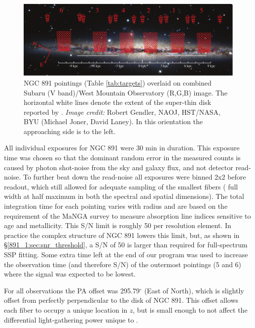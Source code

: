 \begin{figure}
  \centering
  \includegraphics[width=\textwidth]{891_1/figs/NGC_891_better_pointings.pdf}
  \caption[NGC 891 \GP pointing map]{\label{fig:pointings}\fixspacing
    NGC 891 \GP pointings (Table \ref{tab:targets}) overlaid on
    combined Subaru (V band)/West Mountain Observatory (R,G,B)
    image. The horizontal white lines denote the extent of the
    super-thin disk reported by \citet{Schechtman-Rook13}. \emph{Image
      credit:} Robert Gendler, NAOJ, HST/NASA, BYU (Michael Joner,
    David Laney). In this orientation the approaching side is to the
    left.}
\end{figure}

All individual exposures for NGC 891 were 30 min in duration. This
exposure time was chosen so that the dominant random error in the
measured counts is caused by photon shot-noise from the sky and galaxy
flux, and not detector read-noise. To further beat down the read-noise
all exposures were binned 2x2 before readout, which still allowed for
adequate sampling of the smallest fibers ( full
width at half maximum in both the spectral and spatial
dimensions). The total integration time for each pointing varies with
radius and are based on the requirement of the MaNGA survey
\citep{Bundy15} to measure absorption line indices sensitive to age
and metallicity. This S/N limit is roughly 50 per resolution
element. In practice the complex structure of NGC 891 lowers this
limit, but, as shown in \S\ref{891_1:sec:snr_threshold}, a S/N of 50 is
larger than required for full-spectrum SSP fitting. Some extra time
left at the end of our program was used to increase the observation
time (and therefore S/N) of the outermost pointings (5 and 6) where
the signal was expected to be lowest.

For all \GP observations the PA offset was 295.79$^{\circ}$ (East of
North), which is slightly offset from perfectly perpendicular to the
disk of NGC 891. This offset allows each fiber to occupy a unique
location in $z$, but is small enough to not affect the differential
light-gathering power unique to \GP.

